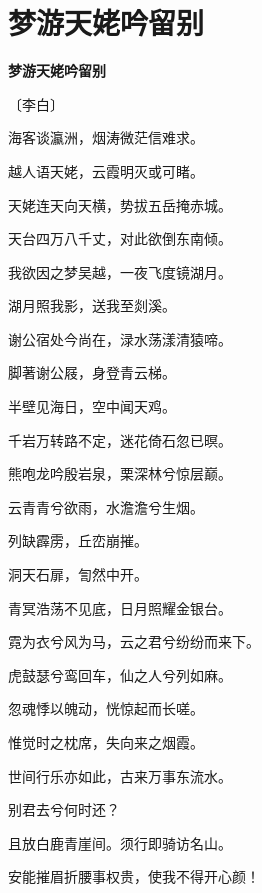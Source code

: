 \documentclass[12pt,UTF-8,openany,fontset=none]{ctexbook}
\begin{document}
\section{梦游天姥吟留别}


\begin{center}
    {\bfseries 梦游天姥吟留别}

    \vspace{18pt}

    \begin{large}\xuwen
        〔李白〕
    \end{large}

\end{center}

    \vspace{18pt}  %

\begin{center}
    \begin{Large}

        \hspace{34pt}海客谈瀛洲，烟涛微茫信难求。

        \hspace{34pt}越人语天姥，云霞明灭或可睹。

        天姥连天向天横，势拔五岳掩赤城。

        天台四万八千丈，对此欲倒东南倾。

        我欲因之梦吴越，一夜飞度镜湖月。

        湖月照我影，送我至剡溪。

        谢公宿处今尚在，渌水荡漾清猿啼。

        脚著谢公屐，身登青云梯。

        半壁见海日，空中闻天鸡。

        千岩万转路不定，迷花倚石忽已暝。

        熊咆龙吟殷岩泉，栗深林兮惊层巅。

        云青青兮欲雨，水澹澹兮生烟。

        列缺霹雳，丘峦崩摧。

        洞天石扉，訇然中开。

        青冥浩荡不见底，日月照耀金银台。

        \hspace{34pt}霓为衣兮风为马，云之君兮纷纷而来下。

        虎鼓瑟兮鸾回车，仙之人兮列如麻。

        忽魂悸以魄动，恍惊起而长嗟。

        惟觉时之枕席，失向来之烟霞。

        世间行乐亦如此，古来万事东流水。

        别君去兮何时还？

        且放白鹿青崖间。须行即骑访名山。

        安能摧眉折腰事权贵，使我不得开心颜！\hspace{24pt}

    \end{Large}

\end{center}
\end{document}
